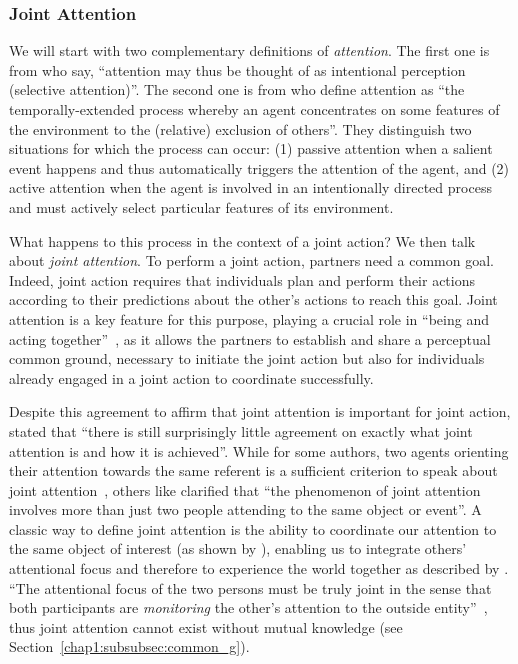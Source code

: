 \documentclass[a4paper,11pt,twoside]{StyleThese}
\begin{document}
\subsubsection{Joint Attention}\label{chap1:subsubsec:joint_att}
We will start with two complementary definitions of \emph{attention}. The first one is from \citet[p.~677]{tomasello_2005_understanding} who say, ``attention may thus be thought of as intentional perception (selective attention)''. The second one is from \citet[p.~138]{kaplan_2006_challenges} who define attention as ``the temporally-extended process whereby an agent concentrates on some features of the environment to the (relative) exclusion of others''. They distinguish two situations for which the process can occur: (1) passive attention when a salient event happens and thus automatically triggers the attention of the agent, and (2) active attention when the agent is involved in an
intentionally directed process and must actively select particular features of its environment. 

What happens to this process in the context of a joint action? We then talk about \emph{joint attention}. To perform a joint action, partners need a common goal. Indeed, joint action requires that individuals plan and perform their actions according to their predictions about the other’s actions to reach this goal. Joint attention is a key feature for this purpose, playing a crucial role in ``being and acting together''~\citep{tomasello_2009_cultural}, as it allows the partners to establish and share a perceptual common ground, necessary to initiate the joint action but also for individuals already engaged in a joint action to coordinate successfully. 

Despite this agreement to affirm that joint attention is important for joint action, \citet[p.~260]{siposova_2019_new} stated that ``there is still surprisingly little agreement on exactly what joint attention is and how it is achieved''. While for some authors, two agents orienting their attention towards the same referent is a sufficient criterion to speak about joint attention~\citep{butterworth_1991_minds}, others like \citet[p.~355]{pacherie_2012_agency} clarified that ``the phenomenon of joint attention involves more than just two people attending to the same object or event''. A classic way to define joint attention is the ability to coordinate our attention to the same object of interest (\eg as shown by \cite{bakeman_1984_coordinating}), enabling us to integrate others’ attentional focus and therefore to experience the world together as described by \cite{tomasello_2009_cultural}.  ``The attentional focus of the two persons must be truly joint in the sense that both participants are \emph{monitoring} the other's attention to the outside entity''~\citep[p.~106]{tomasello_1995_joint}, thus joint attention cannot exist without mutual knowledge (see Section~\ref{chap1:subsubsec:common_g}).
\end{document}
